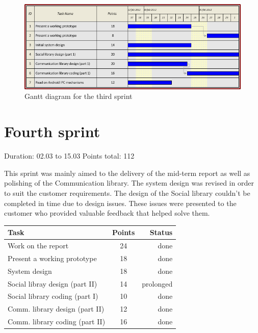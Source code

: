 \begin{figure}[h!]
\centering \includegraphics[scale=0.8]{img/sprints-gantt3.png}
\caption{Gantt diagram for the third sprint}
\label{fig:sprints-gantt3}
\end{figure}

\newpage


\section{Fourth sprint}

Duration: 02.03 to 15.03
Points total: 112

This sprint was mainly aimed to the delivery of the mid-term report as well
as polishing of the Communication library. The system design was revised in
order to suit the customer requirements. The design of the Social library couldn't
be completed in time due to design issues. These issues were presented to the
customer who provided valuable feedback that helped solve them.

\begin{table}[ht!]
\begin{tabular}{ | l | c | r | }

\hline
\textbf{Task} & \textbf{Points} & \textbf{Status} \\
\hline

Work on the report			& 24 & done \\
\hline
Present a working prototype		& 18 & done \\
\hline
System design				& 18 & done \\
\hline
Social libray design (part II)		& 14 & prolonged \\
\hline
Social library coding (part I)		& 10 & done \\
\hline
Comm. library design (part II)		& 12 & done \\
\hline
Comm. library coding (part II)		& 16 & done \\
\hline

\end{tabular}
\end{table}

